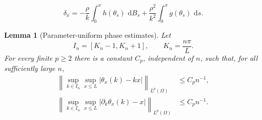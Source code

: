 \documentclass[10pt,a4paper]{amsart}
\newtheorem{lemma}{Lemma}
\newcommand{\dd}{\,\mathrm d}
\begin{document}
\begin{equation}\label{eq:delta-int}
    \delta_x=-\frac{\rho}{k}\int_0^xh(\theta_s)\,\dd B_s
    +\frac{\rho^2}{k^2}\int_0^xg(\theta_s)\,\dd s.
\end{equation}

\begin{lemma}[Parameter-uniform phase estimates]\label{lem:phase-uniform}
Let
\[
    I_n=[K_n-1,K_n+1],\qquad K_n=\frac{n\pi}{L}.
\]
For every finite $p\ge2$ there is a constant $C_p$, independent of $n$, such that, for all sufficiently large $n$,
\begin{align*}
    \left\|\sup_{k\in I_n}\sup_{x\le L}|\theta_x(k)-kx|\right\|_{L^p(\Omega)}
    &\le C_p n^{-1},\\
    \left\|\sup_{k\in I_n}\sup_{x\le L}|\partial_k\theta_x(k)-x|\right\|_{L^p(\Omega)}
    &\le C_p n^{-1}.
\end{align*}
\end{lemma}
\end{document}
